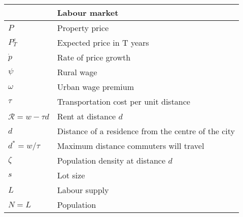 \begin{longtable}{lp{10cm}}
\hline      &  \textbf{Labour market}  \\ \hline %
$P$         &  Property price          \\
$P^e_T$ & Expected price in T years    \\
$\dot p$    &  Rate of price growth    \\
$\psi$      &  Rural wage              \\
$\omega$         &  Urban wage premium \\
$\tau$      &  Transportation cost per unit distance \\
$\mathcal{R} = w-\tau d$ & Rent at distance $d$  \\ 
$d$             &  Distance of a residence from the centre of the city \\
$d^* = w/\tau$  &  Maximum distance commuters will travel \\ %
$\zeta$         &  Population density at distance $d$ \\
$s$             &  Lot size     \\
$L$            &  Labour supply \\ %
$N = L$        &  Population    \\



\end{longtable}
